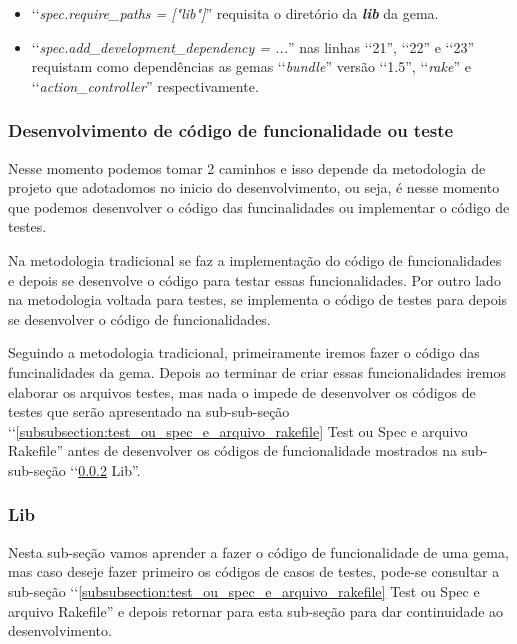 \begin{itemize}
 \item ‘‘\emph{spec.require\_paths = ["lib"]}'' requisita o diretório da \emph{\textbf{lib}} da gema.
 
 \item ‘‘\emph{spec.add\_development\_dependency = ...}'' nas linhas ‘‘21'', ‘‘22'' e ‘‘23'' requistam como 
 dependências as gemas ‘‘\emph{bundle}'' versão ‘‘1.5'', ‘‘\emph{rake}'' e ‘‘\emph{action\_controller}''
 respectivamente.
 
\end{itemize}

\subsubsection{Desenvolvimento de código de funcionalidade ou teste}
\label{subsubsection:desenvolvimento_de_codigo_de_funcionalidade_ou_teste}

Nesse momento podemos tomar 2 caminhos e isso depende da metodologia de projeto que adotadomos no inicio 
do desenvolvimento, ou seja, é nesse momento que podemos desenvolver o código das funcinalidades
ou implementar o código de testes. 

Na metodologia tradicional se faz a implementação do código de funcionalidades e depois se
desenvolve o código para testar essas funcionalidades. Por outro lado na metodologia voltada para 
testes, se implementa o código de testes para depois se desenvolver o código de funcionalidades.

Seguindo a metodologia tradicional, primeiramente iremos fazer o código das funcinalidades da gema.
Depois ao terminar de criar essas funcionalidades iremos elaborar os arquivos testes, mas nada o impede
de desenvolver os códigos de testes que serão apresentado na sub-sub-seção 
‘‘\ref{subsubsection:test_ou_spec_e_arquivo_rakefile} Test ou Spec e arquivo Rakefile'' antes de 
desenvolver os códigos de funcionalidade mostrados na sub-sub-seção ‘‘\ref{subsubsection:lib} Lib''.

\subsubsection{Lib}
\label{subsubsection:lib}

Nesta sub-seção vamos aprender a fazer o código de funcionalidade de uma gema, mas caso deseje fazer 
primeiro os códigos de casos de testes, pode-se consultar a sub-seção 
‘‘\ref{subsubsection:test_ou_spec_e_arquivo_rakefile} Test ou Spec e arquivo Rakefile'' e depois retornar
para esta sub-seção para dar continuidade ao desenvolvimento.

